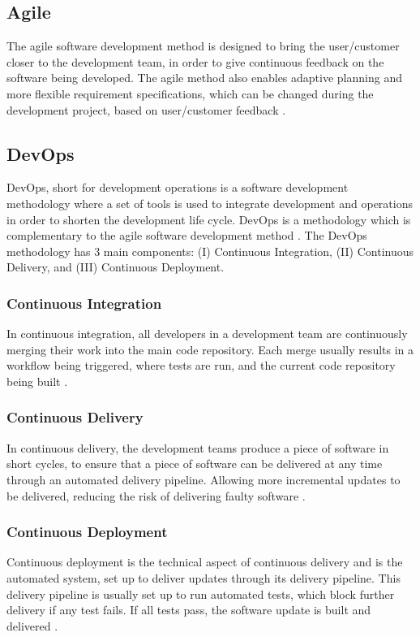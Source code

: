 \subsection{Agile}
The agile software development method is designed to bring the user/customer closer to the development team, in order to give continuous feedback on the software being developed. The agile method also enables adaptive planning and more flexible requirement specifications, which can be changed during the development project, based on user/customer feedback \cite{agile_software_development_wiki_2023}.

\subsection{DevOps}
DevOps, short for development operations is a software development methodology where a set of tools is used to integrate development and operations in order to shorten the development life cycle. DevOps is a methodology which is complementary to the agile software development method \cite{devops_wiki_2023}. The DevOps methodology has 3 main components: (I) Continuous Integration, (II) Continuous Delivery, and (III) Continuous Deployment.

\subsubsection{Continuous Integration}
In continuous integration, all developers in a development team are continuously merging their work into the main code repository. Each merge usually results in a workflow being triggered, where tests are run, and the current code repository being built \cite{continuous_integration_wiki_2023}.

\subsubsection{Continuous Delivery}
In continuous delivery, the development teams produce a piece of software in short cycles, to ensure that a piece of software can be delivered at any time through an automated delivery pipeline. Allowing more incremental updates to be delivered, reducing the risk of delivering faulty software \cite{continuous_delivery_wiki_2023}.

\subsubsection{Continuous Deployment}
Continuous deployment is the technical aspect of continuous delivery and is the automated system, set up to deliver updates through its delivery pipeline. This delivery pipeline is usually set up to run automated tests, which block further delivery if any test fails. If all tests pass, the software update is built and delivered \cite{continuous_deployment_wiki_2023}.

